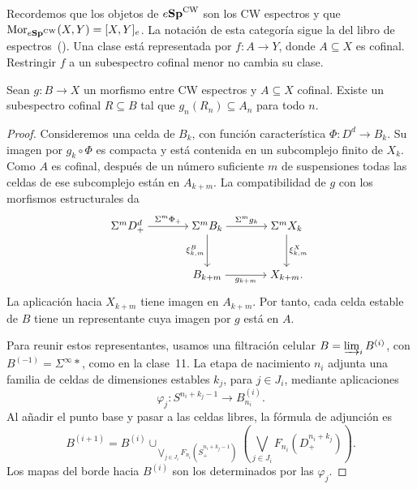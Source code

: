 Recordemos que los objetos de $e\mathbf{Sp}^{\mathrm{CW}}$ son los CW espectros y que $\operatorname{Mor}_{e\mathbf{Sp}^{\mathrm{CW}}}(X,Y)=[X,Y]_e$. La notación de esta categoría sigue la del libro de espectros~(\cite{malkiewich}). Una clase está representada por $f\colon A\to Y$, donde $A\subseteq X$ es cofinal. Restringir $f$ a un subespectro cofinal menor no cambia su clase.

\begin{lema}\label{lema:c12-restriccion-cofinal}
Sean $g\colon B\to X$ un morfismo entre CW espectros y $A\subseteq X$ cofinal. Existe un subespectro cofinal $R\subseteq B$ tal que $g_n(R_n)\subseteq A_n$ para todo $n$.
\end{lema}
\begin{proof}
Consideremos una celda de $B_k$, con función característica $\Phi\colon D^d\to B_k$. Su imagen por $g_k\circ\Phi$ es compacta y está contenida en un subcomplejo finito de $X_k$. Como $A$ es cofinal, después de un número suficiente $m$ de suspensiones todas las celdas de ese subcomplejo están en $A_{k+m}$. La compatibilidad de $g$ con los morfismos estructurales da
\[
\begin{tikzcd}[cramped,column sep=large,row sep=large]
\Sigma^mD^d_+ \arrow[r,"\Sigma^m\Phi_+"]
& \Sigma^mB_k \arrow[r,"\Sigma^mg_k"] \arrow[d,"\xi^B_{k,m}"']
& \Sigma^mX_k \arrow[d,"\xi^X_{k,m}"]\\
& B_{k+m} \arrow[r,"g_{k+m}"'] & X_{k+m}.
\end{tikzcd}
\]
La aplicación hacia $X_{k+m}$ tiene imagen en $A_{k+m}$. Por tanto, cada celda estable de $B$ tiene un representante cuya imagen por $g$ está en $A$.

Para reunir estos representantes, usamos una filtración celular $B=\varinjlim\nolimits_iB^{(i)}$, con $B^{(-1)}=\Sigma^\infty *$, como en la clase~11. La etapa de nacimiento $n_i$ adjunta una familia de celdas de dimensiones estables $k_j$, para $j\in J_i$, mediante aplicaciones
\[
\varphi_j\colon S^{n_i+k_j-1}\longrightarrow B^{(i)}_{n_i}.
\]
Al añadir el punto base y pasar a las celdas libres, la fórmula de adjunción es
\[
B^{(i+1)}=B^{(i)}
\cup_{\bigvee_{j\in J_i}F_{n_i}(S^{n_i+k_j-1}_+)}
\left(\bigvee_{j\in J_i}F_{n_i}(D^{n_i+k_j}_+)\right).
\]
Los mapas del borde hacia $B^{(i)}$ son los determinados por las $\varphi_j$.


\end{proof}
